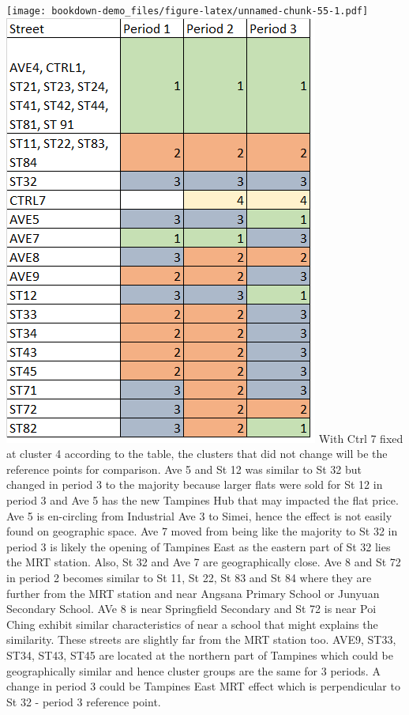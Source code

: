 \documentclass[]{book}
\begin{document}
\texttt{[image: bookdown-demo\_files/figure-latex/unnamed-chunk-55-1.pdf]}
\includegraphics{table cluster.png} With Ctrl 7 fixed at cluster 4
according to the table, the clusters that did not change will be the
reference points for comparison. Ave 5 and St 12 was similar to St 32
but changed in period 3 to the majority because larger flats were sold
for St 12 in period 3 and Ave 5 has the new Tampines Hub that may
impacted the flat price. Ave 5 is en-circling from Industrial Ave 3 to
Simei, hence the effect is not easily found on geographic space. Ave 7
moved from being like the majority to St 32 in period 3 is likely the
opening of Tampines East as the eastern part of St 32 lies the MRT
station. Also, St 32 and Ave 7 are geographically close. Ave 8 and St 72
in period 2 becomes similar to St 11, St 22, St 83 and St 84 where they
are further from the MRT station and near Angsana Primary School or
Junyuan Secondary School. AVe 8 is near Springfield Secondary and St 72
is near Poi Ching exhibit similar characteristics of near a school that
might explains the similarity. These streets are slightly far from the
MRT station too. AVE9, ST33, ST34, ST43, ST45 are located at the
northern part of Tampines which could be geographically similar and
hence cluster groups are the same for 3 periods. A change in period 3
could be Tampines East MRT effect which is perpendicular to St 32 -
period 3 reference point.
\end{document}
